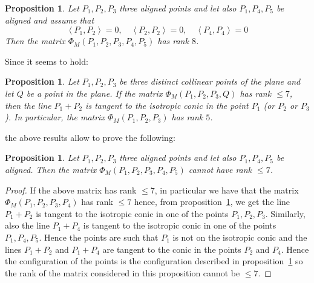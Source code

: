 \documentclass[10pt, a4paper, reqno, captions=tableheading,bibliography=totoc]{scrartcl}
\theoremstyle{plain}
\newtheorem{prop}[lemma]{Proposition}
\theoremstyle{definition}
\newcommand{\scl}[2]{\left\langle {#1}, {#2} \right\rangle}
\begin{document}
\begin{prop}
Let $P_1, P_2, P_3$ three aligned points and let also $P_1, P_4, P_5$
be aligned and assume that
\[
\scl{P_1}{P_2}=0, \quad \scl{P_2}{P_2}=0, \quad \scl{P_4}{P_4}=0
\]
Then the matrix $\Phi_M(P_1, P_2, P_3, P_4, P_5)$ has rank $8$.
\label{frecciaFissata}
\end{prop}

Since it seems to hold:
\begin{prop}
  Let $P_1, P_2, P_3$ be three distinct collinear points of the
  plane and let $Q$ be a point
  in the plane. If the matrix $\Phi_M(P_1, P_2, P_3, Q)$ has rank $\leq 7$,
  then the line $P_1+P_2$ is tangent to the isotropic conic in the point
  $P_1$ (or $P_2$ or $P_3$). In particular, the matrix $\Phi_M(P_1, P_2, P_3)$
  has rank $5$.
  \label{condition3+1}
\end{prop}

the above results allow to prove the following:

\begin{prop}
  Let $P_1, P_2, P_3$ three aligned points and let also $P_1, P_4, P_5$
  be aligned. Then the matrix $\Phi_M(P_1, P_2, P_3, P_4, P_5)$ cannot
  have rank $\leq 7$. 
\end{prop}
\begin{proof}
  If the above matrix has rank $\leq 7$, in particular we have that
  the matrix $\Phi_M(P_1, P_2, P_3, P_4)$ has rank $\leq 7$ hence, from 
  proposition~\ref{condition3+1}, we get the line $P_1+P_2$ is
  tangent to the isotropic conic in one of the points $P_1, P_2, P_3$.
  Similarly, also the line $P_1+P_4$ is tangent to the isotropic conic
  in one of the points $P_1, P_4, P_5$. Hence the points are such that
  $P_1$ is not on the isotropic conic and the lines $P_1+P_2$ and
  $P_1+P_4$ are tangent to the conic in the points $P_2$ and $P_4$.
  Hence the configuration of the points is the configuration described
  in proposition~\ref{frecciaFissata} so the rank of the matrix
  considered in this proposition cannot be $\leq 7$. 
\end{proof}
\end{document}
